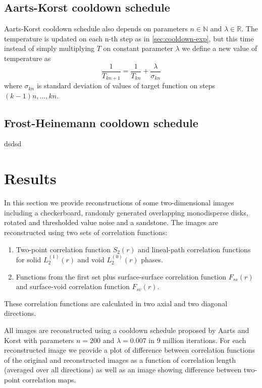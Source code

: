 \documentclass[preprint,amsmath,amssymb,aps,pre]{revtex4-1}
\begin{document}
\subsection{Aarts-Korst cooldown schedule}
\label{sec:cooldown-aarts-korst}
Aarts-Korst cooldown schedule \cite{Aarts-Korst} also depends on parameters
$n \in \mathbb{N}$ and $\lambda \in \mathbb{R}$. The temperature is updated on
each n-th step as in \cref{sec:cooldown-exp}, but this time instead of simply
multiplying $T$ on constant parameter $\lambda$ we define a new value of
temperature as
\begin{equation*}
  \frac{1}{T_{kn+1}} = \frac{1}{T_{kn}} + \frac{\lambda}{\sigma_{kn}}
\end{equation*}
where $\sigma_{kn}$ is standard deviation of values of target function on steps
$(k-1)n, \dots, kn$.

\subsection{Frost-Heinemann cooldown schedule}
\label{sec:cooldown-frost-heinemann}
dsdsd

\section{Results}
In this section we provide reconstructions of some two-dimensional images
including a checkerboard, randomly generated overlapping monodisperse disks,
rotated and thresholded value noise and a sandstone. The images are
reconstructed using two sets of correlation functions:
\begin{enumerate}
\item Two-point correlation function $S_2(r)$ and lineal-path correlation
  functions for solid $L_2^{(1)}(r)$ and void $L_2^{(0)}(r)$ phases.
\item Functions from the first set plus surface-surface correlation function
  $F_{ss}(r)$ and surface-void correlation function $F_{sv}(r)$.
\end{enumerate}
These correlation functions are calculated in two axial and two diagonal
directions.

All images are reconstructed using a cooldown schedule proposed by Aarts and
Korst \cite{Aarts-Korst} with parameters $n = 200$ and $\lambda = 0.007$ in 9
million iterations. For each reconstructed image we provide a plot of difference
between correlation functions of the original and reconstructed images as a
function of correlation length (averaged over all directions) as well as an
image showing difference between two-point correlation maps.
\end{document}
